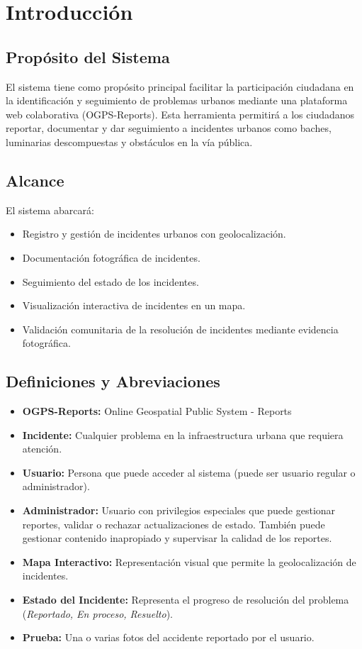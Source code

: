 \section{Introducción}

\subsection{Propósito del Sistema}
El sistema tiene como propósito principal facilitar la participación ciudadana en la identificación y seguimiento de problemas urbanos mediante una plataforma web colaborativa (OGPS-Reports). Esta herramienta permitirá a los ciudadanos reportar, documentar y dar seguimiento a incidentes urbanos como baches, luminarias descompuestas y obstáculos en la vía pública.

\subsection{Alcance}
El sistema abarcará:
\begin{itemize}
    \item Registro y gestión de incidentes urbanos con geolocalización.
    \item Documentación fotográfica de incidentes.
    \item Seguimiento del estado de los incidentes.
    \item Visualización interactiva de incidentes en un mapa.
    \item Validación comunitaria de la resolución de incidentes mediante evidencia fotográfica.
\end{itemize}

\subsection{Definiciones y Abreviaciones}
\begin{itemize}
    \item \textbf{OGPS-Reports:} Online Geospatial Public System - Reports
    \item \textbf{Incidente:} Cualquier problema en la infraestructura urbana que requiera atención.
    \item \textbf{Usuario:} Persona que puede acceder al sistema (puede ser usuario regular o administrador).
    \item \textbf{Administrador:} Usuario con privilegios especiales que puede gestionar reportes, validar o rechazar actualizaciones de estado. También puede gestionar contenido inapropiado y supervisar la calidad de los reportes.
    \item \textbf{Mapa Interactivo:} Representación visual que permite la geolocalización de incidentes.
    \item \textbf{Estado del Incidente:} Representa el progreso de resolución del problema (\textit{Reportado, En proceso, Resuelto}).
    \item \textbf{Prueba:} Una o varias fotos del accidente reportado por el usuario. 
\end{itemize}
